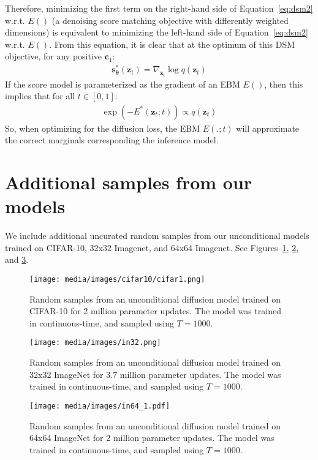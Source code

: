 \documentclass{article}
\def\Eqref#1{Equation~\ref{#1}}
\def\rvc{{\mathbf{c}}}
\def\rvz{{\mathbf{z}}}
\newcommand{\bT}{{\boldsymbol{\theta}}}
\newcommand{\snT}{\mathbf{s}_{\bT}}
\begin{document}
Therefore, minimizing the first term on the right-hand side of \Eqref{eq:dsm2} w.r.t. $E()$ (a denoising score matching objective with differently weighted dimensions) is equivalent to minimizing the left-hand side of \Eqref{eq:dsm2} w.r.t. $E()$. 
From this equation, it is clear that at the optimum of this DSM objective, for any positive $\rvc_1$:
\begin{align}
    \snT^*(\rvz_t) = \nabla_{\rvz_t} \log q(\rvz_t)
\end{align}
If the score model is parameterized as the gradient of an EBM $E()$, then this implies that for all $t \in [0,1]$:
\begin{align}
    \exp(-E^*(\rvz_t; t)) \propto q(\rvz_t)
\label{eq:consistency}\end{align}
So, when optimizing for the diffusion loss, the EBM $E(.;t)$ will approximate the correct marginals corresponding the inference model.



\section{Additional samples from our models}
\label{sec:app_more_samples}
We include additional uncurated random samples from our unconditional models trained on CIFAR-10, 32x32 Imagenet, and 64x64 Imagenet. See Figures~\ref{fig:extracifar}, \ref{fig:in32}, and \ref{fig:in64}.

\begin{figure}[htb]
    \centering
    \texttt{[image: media/images/cifar10/cifar1.png]}
    \caption{Random samples from an unconditional diffusion model trained on CIFAR-10 for 2 million parameter updates. The model was trained in continuous-time, and sampled using $T=1000$.}
    \label{fig:extracifar}
\end{figure}

\begin{figure}[htb]
    \centering
    \texttt{[image: media/images/in32.png]}
    \caption{Random samples from an unconditional diffusion model trained on 32x32 ImageNet for 3.7 million parameter updates. The model was trained in continuous-time, and sampled using $T=1000$.}
    \label{fig:in32}
\end{figure}

\begin{figure}[htb]
    \centering
    \texttt{[image: media/images/in64\_1.pdf]}
    \caption{Random samples from an unconditional diffusion model trained on 64x64 ImageNet for 2 million parameter updates. The model was trained in continuous-time, and sampled using $T=1000$.}
    \label{fig:in64}
\end{figure}
\end{document}
